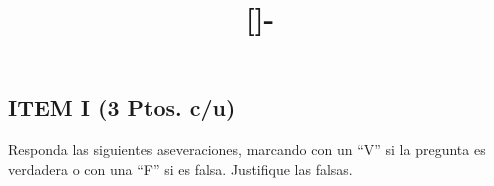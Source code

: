 \documentclass{templateNote}
\begin{document}

\title{[\asignatura]-\titulo}
\author{
    \autor
}
\portada
\margenes %

\subsection*{ITEM I (3 Ptos. c/u)}
\noindent Responda las siguientes aseveraciones, marcando con un “V” si la pregunta es verdadera o con una “F” si es 
falsa. Justifique las falsas.
\end{document}
